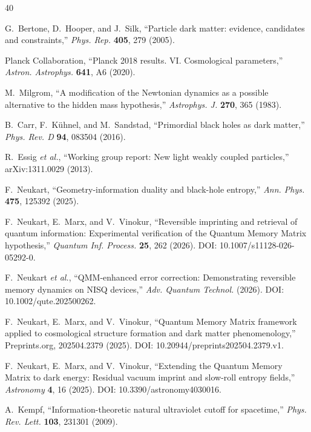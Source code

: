 ﻿\documentclass[12pt,a4paper]{article}
\begin{document}
\begin{thebibliography}{40}

G.~Bertone, D.~Hooper, and J.~Silk,
``Particle dark matter: evidence, candidates and constraints,''
\textit{Phys. Rep.} \textbf{405}, 279 (2005).

Planck Collaboration,
``Planck 2018 results. VI. Cosmological parameters,''
\textit{Astron. Astrophys.} \textbf{641}, A6 (2020).

M.~Milgrom,
``A modification of the Newtonian dynamics as a possible alternative to the hidden mass hypothesis,''
\textit{Astrophys. J.} \textbf{270}, 365 (1983).

B.~Carr, F.~K\"uhnel, and M.~Sandstad,
``Primordial black holes as dark matter,''
\textit{Phys. Rev. D} \textbf{94}, 083504 (2016).

R.~Essig \textit{et al.},
``Working group report: New light weakly coupled particles,''
arXiv:1311.0029 (2013).

F.~Neukart,
``Geometry-information duality and black-hole entropy,''
\textit{Ann. Phys.} \textbf{475}, 125392 (2025).

F.~Neukart, E.~Marx, and V.~Vinokur,
``Reversible imprinting and retrieval of quantum information: Experimental verification of the Quantum Memory Matrix hypothesis,''
\textit{Quantum Inf. Process.} \textbf{25}, 262 (2026).
DOI: 10.1007/s11128-026-05292-0.

F.~Neukart \textit{et al.},
``QMM-enhanced error correction: Demonstrating reversible memory dynamics on NISQ devices,''
\textit{Adv. Quantum Technol.} (2026).
DOI: 10.1002/qute.202500262.

F.~Neukart, E.~Marx, and V.~Vinokur,
``Quantum Memory Matrix framework applied to cosmological structure formation and dark matter phenomenology,''
Preprints.org, 202504.2379 (2025).
DOI: 10.20944/preprints202504.2379.v1.

F.~Neukart, E.~Marx, and V.~Vinokur,
``Extending the Quantum Memory Matrix to dark energy: Residual vacuum imprint and slow-roll entropy fields,''
\textit{Astronomy} \textbf{4}, 16 (2025).
DOI: 10.3390/astronomy4030016.

A.~Kempf,
``Information-theoretic natural ultraviolet cutoff for spacetime,''
\textit{Phys. Rev. Lett.} \textbf{103}, 231301 (2009).


\end{thebibliography}
\end{document}
